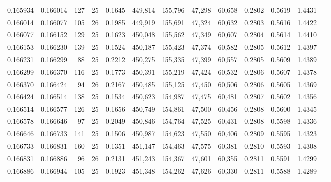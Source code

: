 \begin{tabular}{rrrrrrrrrrrrr}
0.165934 & 0.166014 &   127 &  25 &                                     0.1645 & 449,814 & 155,796 &  47,298 &  60,658 & 0.2802 & 0.5619 & 1.4431 \\
0.166014 & 0.166077 &   105 &  26 &                                     0.1985 & 449,919 & 155,691 &  47,324 &  60,632 & 0.2803 & 0.5616 & 1.4422 \\
0.166077 & 0.166152 &   129 &  25 &                                     0.1623 & 450,048 & 155,562 &  47,349 &  60,607 & 0.2804 & 0.5614 & 1.4410 \\
0.166153 & 0.166230 &   139 &  25 &                                     0.1524 & 450,187 & 155,423 &  47,374 &  60,582 & 0.2805 & 0.5612 & 1.4397 \\
0.166231 & 0.166299 &    88 &  25 &                                     0.2212 & 450,275 & 155,335 &  47,399 &  60,557 & 0.2805 & 0.5609 & 1.4389 \\
0.166299 & 0.166370 &   116 &  25 &                                     0.1773 & 450,391 & 155,219 &  47,424 &  60,532 & 0.2806 & 0.5607 & 1.4378 \\
0.166370 & 0.166424 &    94 &  26 &                                     0.2167 & 450,485 & 155,125 &  47,450 &  60,506 & 0.2806 & 0.5605 & 1.4369 \\
0.166424 & 0.166514 &   138 &  25 &                                     0.1534 & 450,623 & 154,987 &  47,475 &  60,481 & 0.2807 & 0.5602 & 1.4356 \\
0.166514 & 0.166577 &   126 &  25 &                                     0.1656 & 450,749 & 154,861 &  47,500 &  60,456 & 0.2808 & 0.5600 & 1.4345 \\
0.166578 & 0.166646 &    97 &  25 &                                     0.2049 & 450,846 & 154,764 &  47,525 &  60,431 & 0.2808 & 0.5598 & 1.4336 \\
0.166646 & 0.166733 &   141 &  25 &                                     0.1506 & 450,987 & 154,623 &  47,550 &  60,406 & 0.2809 & 0.5595 & 1.4323 \\
0.166733 & 0.166831 &   160 &  25 &                                     0.1351 & 451,147 & 154,463 &  47,575 &  60,381 & 0.2810 & 0.5593 & 1.4308 \\
0.166831 & 0.166886 &    96 &  26 &                                     0.2131 & 451,243 & 154,367 &  47,601 &  60,355 & 0.2811 & 0.5591 & 1.4299 \\
0.166886 & 0.166944 &   105 &  25 &                                     0.1923 & 451,348 & 154,262 &  47,626 &  60,330 & 0.2811 & 0.5588 & 1.4289 \\

\end{tabular}
